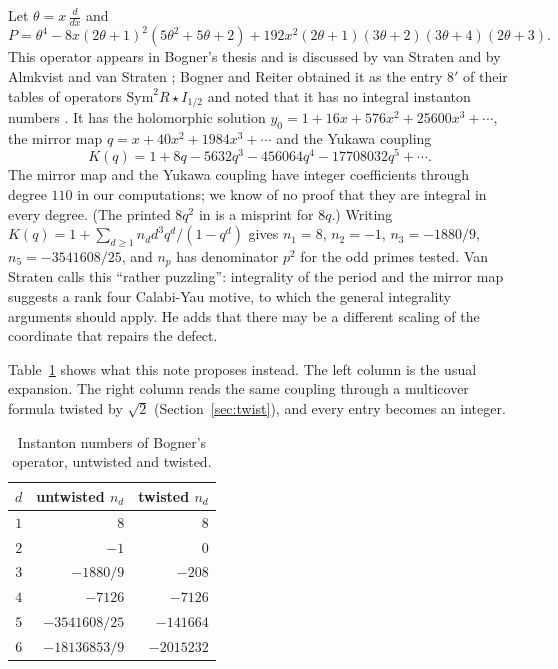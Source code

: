 \documentclass[11pt]{amsart}
\theoremstyle{definition}
\theoremstyle{remark}
\begin{document}
Let $\theta=x\,\frac{d}{dx}$ and
\[
P=\theta^4-8x(2\theta+1)^2(5\theta^2+5\theta+2)+192x^2(2\theta+1)(3\theta+2)(3\theta+4)(2\theta+3).
\]
This operator appears in Bogner's thesis \cite{Bog12} and is discussed by van Straten
\cite[pp.~28--29]{vS17} and by Almkvist and van Straten \cite[p.~22 of arXiv v1]{AvS}; Bogner and Reiter
obtained it as the entry $8'$ of their tables of operators $\mathrm{Sym}^2R\star I_{1/2}$ and noted that it has no
integral instanton numbers \cite[arXiv v1, Proposition~3.6 and the tables of \S\S4.2 and 4.4, pp.~14 and 19]{BR}. It has the holomorphic
solution $y_0=1+16x+576x^2+25600x^3+\cdots$, the mirror map $q=x+40x^2+1984x^3+\cdots$
and the Yukawa coupling
\[
K(q)=1+8q-5632q^3-456064q^4-17708032q^5+\cdots.
\]
The mirror map and the Yukawa coupling have integer coefficients through degree $110$ in our computations;
we know of no proof that they are integral in every degree. (The printed $8q^2$ in \cite{AvS} is a misprint
for $8q$.) Writing
$K(q)=1+\sum_{d\ge1}n_d d^3 q^d/(1-q^d)$ gives $n_1=8$, $n_2=-1$, $n_3=-1880/9$,
$n_5=-3541608/25$, and $n_p$ has denominator $p^2$ for the odd primes tested. Van Straten calls this ``rather
puzzling'': integrality of the period and the mirror map suggests a rank four Calabi-Yau motive, to
which the general integrality arguments should apply. He adds that there may be a different scaling
of the coordinate that repairs the defect.

Table~\ref{tab:first} shows what this note proposes instead. The left column is the usual expansion.
The right column reads the same coupling through a multicover formula twisted by $\sqrt2$
(Section~\ref{sec:twist}), and every entry becomes an integer.

\begin{table}[h]
\centering
\begin{tabular}{rrr}
\toprule
$d$ & untwisted $n_d$ & twisted $n_d$\\
\midrule
$1$ & $8$ & $8$\\
$2$ & $-1$ & $0$\\
$3$ & $-1880/9$ & $-208$\\
$4$ & $-7126$ & $-7126$\\
$5$ & $-3541608/25$ & $-141664$\\
$6$ & $-18136853/9$ & $-2015232$\\
\bottomrule
\end{tabular}
\caption{Instanton numbers of Bogner's operator, untwisted and twisted.}\label{tab:first}
\end{table}
\end{document}
